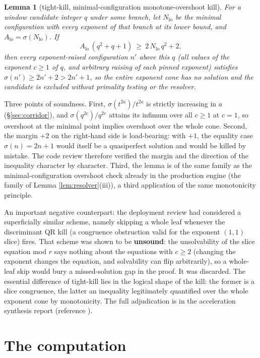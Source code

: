 \documentclass[11pt]{article}
\newtheorem{lemma}{Lemma}
\theoremstyle{remark}
\begin{document}
\begin{lemma}[tight-kill, minimal-configuration monotone-overshoot kill] \label{lem:tightkill} For a window candidate integer $q$ under some branch, let $N_{\mathrm{lo}}$ be the minimal configuration with every exponent of that branch at its lower bound, and $A_{\mathrm{lo}} = \sigma(N_{\mathrm{lo}})$. If
\[ A_{\mathrm{lo}}\,(q^2 + q + 1) \ \ge\ 2\,N_{\mathrm{lo}}\,q^2 + 2,
\] then every exponent-raised configuration $n'$ above this $q$ (all values of the exponent $c \ge 1$ of $q$, and arbitrary raising of each pinned exponent) satisfies $\sigma(n') \ge 2n' + 2 > 2n' + 1$, so the entire exponent cone has no solution and the candidate is excluded without primality testing or the resolver.
\end{lemma}

Three points of soundness. First, $\sigma(t^{2a})/t^{2a}$ is strictly increasing in $a$ (\S\ref{sec:corridor}), and $\sigma(q^{2c})/q^{2c}$ attains its infimum over all $c \ge 1$ at $c = 1$, so overshoot at the minimal point implies overshoot over the whole cone. Second, the margin $+2$ on the right-hand side is load-bearing: with $+1$, the equality case $\sigma(n) = 2n + 1$ would itself be a quasiperfect solution and would be killed by mistake. The code review therefore verified the margin and the direction of the inequality character by character. Third, the lemma is of the same family as the minimal-configuration overshoot check already in the production engine (the family of Lemma \ref{lem:resolver}(iii)), a third application of the same monotonicity principle.

An important negative counterpart: the deployment review had considered a superficially similar scheme, namely skipping a whole leaf whenever the discriminant QR kill (a congruence obstruction valid for the exponent $(1,1)$ slice) fires. That scheme was shown to be \textbf{unsound}: the unsolvability of the slice equation mod $r$ says nothing about the equations with $c \ge 2$ (changing the exponent changes the equation, and solvability can flip arbitrarily), so a whole-leaf skip would bury a missed-solution gap in the proof. It was discarded. The essential difference of tight-kill lies in the logical shape of the kill: the former is a slice congruence, the latter an inequality legitimately quantified over the whole exponent cone by monotonicity. The full adjudication is in the acceleration synthesis report (reference \cite{internal}).

\section{The computation}\label{sec:comp}
\end{document}
